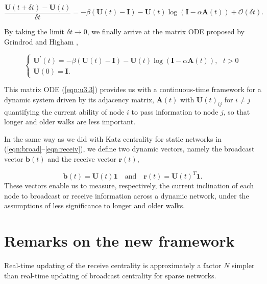 \begin{equation*}
\label{eqn:u3.1b}
    \frac{\mathbf{U}(t + \delta t) - \mathbf{U}(t)}{\delta t} = -\beta (\mathbf{U}(t) - \mathbf{I}) - \mathbf{U}(t)\log (\mathbf{I} - \alpha \mathbf{A}(t)) + \mathcal{O}(\delta t).
\end{equation*}

By taking the limit $\delta t \to 0$, we finally arrive at the matrix ODE proposed by Grindrod and Higham \cite{grindrod2014dynamical}, 

\begin{equation}
\label{eqn:u3.3}
    \begin{cases}
      \mathbf{U^{\prime}}(t) = -\beta (\mathbf{U}(t) - \mathbf{I}) - \mathbf{U}(t)\log (\mathbf{I} - \alpha \mathbf{A}(t)), ~~~t>0\\
      \mathbf{U}(0)=\mathbf{I}.
    \end{cases}
\end{equation}

This matrix ODE (\ref{eqn:u3.3}) provides us with a continuous-time framework for a dynamic system driven by its adjacency matrix, $\mathbf{A}(t)$ with $\mathbf{U}(t)_{ij}$ for $i\ne j$ quantifying the current ability of node $i$ to pass information to node $j$, so that longer and older walks are less important.

In the same way as we did with Katz centrality for static networks in (\ref{eqn:broad}--\ref{eqn:receiv}), we define two dynamic vectors, namely the broadcast vector $\mathbf{b}(t)$ and the receive vector $\mathbf{r}(t)$,

\begin{equation}
\label{eqn:u3.4}
    \mathbf{b}(t) = \mathbf{U}(t)\mathbf{1} \text{~~~and~~~} \mathbf{r}(t) = \mathbf{U}(t)^T\mathbf{1}.
\end{equation}
These vectors enable us to measure, respectively, the current inclination of each node to broadcast or receive information across a dynamic network, under the assumptions of less significance to longer and older walks.


\section{Remarks on the new framework}
\label{sec:remarks}

\begin{highlightedParagraphC}
 
Real-time updating of the receive centrality is approximately a factor $N$ simpler than real-time updating of broadcast centrality for sparse networks.

\end{highlightedParagraphC}

